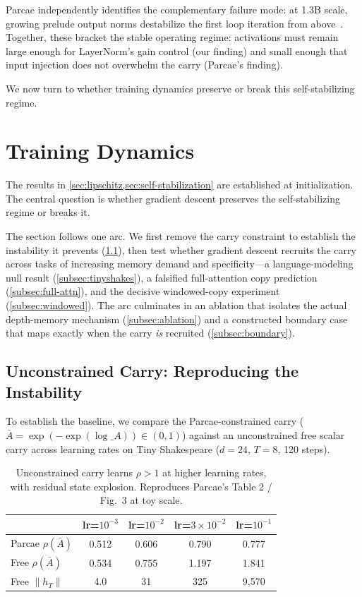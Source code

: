 \documentclass[11pt]{article}
\begin{document}
Parcae independently identifies the complementary failure mode: at 1.3B scale, growing prelude output norms destabilize the first loop iteration from above~\citep[Fig.~21--22]{parcae2026}. Together, these bracket the stable operating regime: activations must remain large enough for LayerNorm's gain control (our finding) and small enough that input injection does not overwhelm the carry (Parcae's finding).

We now turn to whether training dynamics preserve or break this self-stabilizing regime.


\section{Training Dynamics}
\label{sec:training}

The results in \cref{sec:lipschitz,sec:self-stabilization} are established at initialization. The central question is whether gradient descent preserves the self-stabilizing regime or breaks it.

The section follows one arc. We first remove the carry constraint to establish the instability it prevents (\cref{subsec:unconstrained}), then test whether gradient descent recruits the carry across tasks of increasing memory demand and specificity---a language-modeling null result (\cref{subsec:tinyshakes}), a falsified full-attention copy prediction (\cref{subsec:full-attn}), and the decisive windowed-copy experiment (\cref{subsec:windowed}). The arc culminates in an ablation that isolates the actual depth-memory mechanism (\cref{subsec:ablation}) and a constructed boundary case that maps exactly when the carry \emph{is} recruited (\cref{subsec:boundary}).

\subsection{Unconstrained Carry: Reproducing the Instability}
\label{subsec:unconstrained}

To establish the baseline, we compare the Parcae-constrained carry ($\bar{A} = \exp(-\exp(\log\_A)) \in (0,1)$) against an unconstrained free scalar carry across learning rates on Tiny Shakespeare ($d=24$, $T=8$, 120 steps).

\begin{table}[ht]
\centering
\begin{tabular}{@{}lcccc@{}}
\toprule
 & lr=$10^{-3}$ & lr=$10^{-2}$ & lr=$3 \times 10^{-2}$ & lr=$10^{-1}$ \\
\midrule
Parcae $\rho(\bar{A})$ & 0.512 & 0.606 & 0.790 & 0.777 \\
Free $\rho(\bar{A})$ & 0.534 & 0.755 & 1.197 & 1.841 \\
Free $\|h_T\|$ & 4.0 & 31 & 325 & 9,570 \\
\bottomrule
\end{tabular}
\caption{Unconstrained carry learns $\rho > 1$ at higher learning rates, with residual state explosion. Reproduces Parcae's Table 2 / Fig.\ 3 at toy scale.}
\label{tab:unconstrained}
\end{table}
\end{document}
